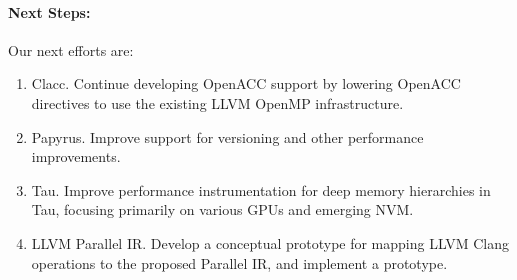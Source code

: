 \paragraph{Next Steps:}

Our next efforts are:

\begin{enumerate}
	\item Clacc. Continue developing OpenACC support by lowering OpenACC directives to use the existing LLVM OpenMP infrastructure.
    
	\item Papyrus. Improve support for versioning and other performance improvements.
    
    \item Tau. Improve performance instrumentation for deep memory hierarchies in Tau, focusing primarily on various GPUs and emerging NVM.
    
    \item LLVM Parallel IR. Develop a conceptual prototype for mapping LLVM Clang operations to the proposed Parallel IR, and implement a prototype.

\end{enumerate}
